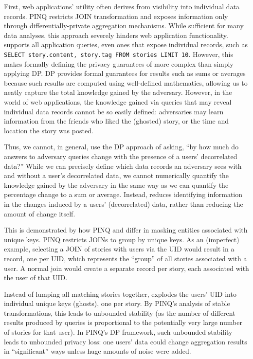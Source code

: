 First, web applications' utility often derives from visibility into individual data records. PINQ
restricts JOIN transformation and exposes information only through differentially-private
aggregation mechanisms. While sufficient for many data analyses, this approach severely hinders web
application functionality. \name supports all application queries, even ones that expose individual
records, such as \texttt{SELECT story.content, story.tag FROM stories LIMIT 10}.  
However, this makes formally defining the privacy guarantees of \name more complex than
simply applying DP.  DP provides formal guarantees for results such as sums or averages because such
results are computed using well-defined mathematics, allowing us to neatly capture the total
knowledge gained by the adversary. However, in the world of web applications, the knowledge gained
via queries that may reveal individual data records cannot be so easily defined: adversaries may
learn information from the friends who liked the (ghosted) story, or the time and location the story
was posted.

Thus, we cannot, in general, use the DP approach of asking, ``by how much do answers to adversary
queries change with the presence of a users' decorrelated data?'' While we can precisely define which
data records an adversary sees with and without a user's decorrelated data, we cannot numerically
quantify the knowledge gained by the adversary in the same way as we can quantify the percentage
change to a sum or average.
Instead, \name reduces identifying information in the changes induced by a users' (decorrelated)
data, rather than reducing the amount of change itself.

This is demonstrated by how PINQ and \name differ in masking entities associated with unique keys.
PINQ restricts JOINs to group by unique keys. As an (imperfect) example, selecting a JOIN of stories
with users via the UID would result in a record, one per UID, which represents the ``group'' of all
stories associated with a user. A normal join would create a separate record per story, each
associated with the user of that UID.

Instead of lumping all matching stories together, \name explodes the users' UID into individual
unique keys (ghosts), one per story. By PINQ's analysis of stable transformations, this leads to
unbounded stability (as the number of different results produced by queries is proportional to the
potentially very large number of stories for that user). In PINQ's DP framework, such unbounded
stability leads to unbounded privacy loss: one users' data could change aggregation results in
``significant'' ways unless huge amounts of noise were added. 

